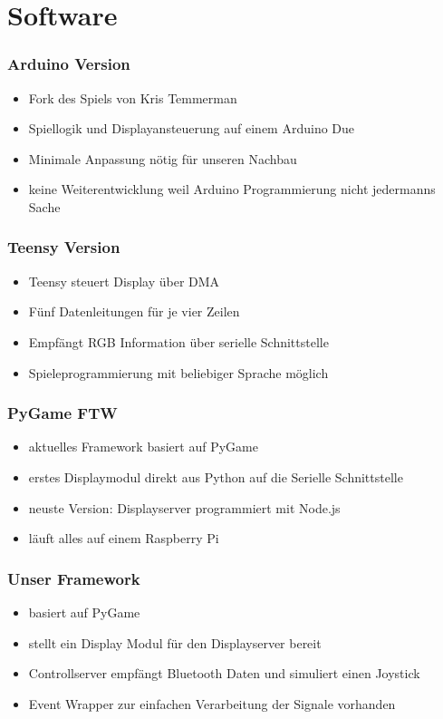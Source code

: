 \documentclass[aspectratio=1610,svgnames]{beamer}
\newcommand{\divider}[1]{\begin{frame} %
\begin{alertblock}{} %
\centering\usebeamerfont{section title}#1 %
\end{alertblock} %
\end{frame}}
\begin{document}
\section{Software}
\divider{\insertsection}
\begin{frame}[<+->]
    \frametitle{Arduino Version}
    \begin{itemize}
        \item Fork des Spiels von Kris Temmerman
        \item Spiellogik und Displayansteuerung auf einem Arduino Due
        \item Minimale Anpassung nötig für unseren Nachbau
        \item keine Weiterentwicklung weil Arduino Programmierung nicht jedermanns Sache
    \end{itemize}
\end{frame}
\begin{frame}[<+->]
    \frametitle{Teensy Version}
    \begin{itemize}
        \item Teensy steuert Display über DMA
        \item Fünf Datenleitungen für je vier Zeilen
        \item Empfängt RGB Information über serielle Schnittstelle
        \item Spieleprogrammierung mit beliebiger Sprache möglich
    \end{itemize}
\end{frame}
\begin{frame}[<+->]
    \frametitle{PyGame FTW}
    \begin{itemize}
        \item aktuelles Framework basiert auf PyGame
        \item erstes Displaymodul direkt aus Python auf die Serielle Schnittstelle
        \item neuste Version: Displayserver programmiert mit Node.js
        \item läuft alles auf einem Raspberry Pi
    \end{itemize}
\end{frame}
\begin{frame}[<+->]
    \frametitle{Unser Framework}
    \begin{itemize}
        \item basiert auf PyGame
        \item stellt ein Display Modul für den Displayserver bereit
        \item Controllserver empfängt Bluetooth Daten und simuliert einen Joystick
        \item Event Wrapper zur einfachen Verarbeitung der Signale vorhanden
    \end{itemize}
\end{frame}
\end{document}
